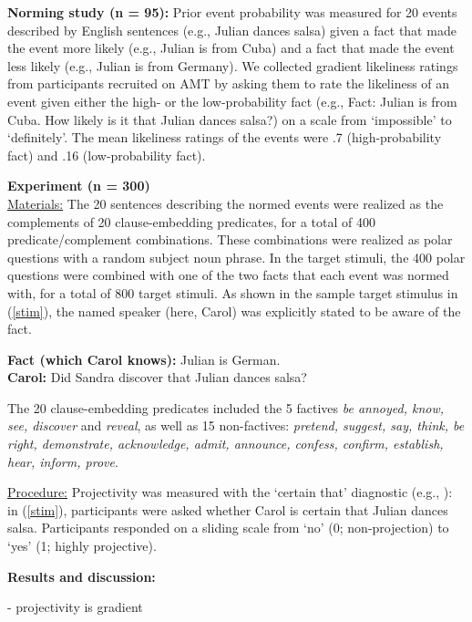 \documentclass[12pt,fleqn]{article}
\newcommand{\6}{\mbox{$[\hspace*{-.6mm}[$}}
\newcommand{\9}{\mbox{$]\hspace*{-.6mm}]$}}
\begin{document}
\noindent
{\bf Norming study (n = 95):} Prior event probability was measured for 20 events described by English sentences (e.g., Julian dances salsa) given a fact that made the event more likely (e.g., Julian is from Cuba) and a fact that made the event less likely (e.g., Julian is from Germany). We collected gradient likeliness ratings from participants recruited on AMT by asking them to rate the likeliness of an event given either the high-  or the low-probability fact (e.g., Fact: Julian is from Cuba. How likely is it that Julian dances salsa?) on a scale from `impossible' to `definitely'. The mean likeliness ratings of the events were .7 (high-probability fact) and .16 (low-probability fact).

\noindent 
{\bf Experiment (n = 300)} 
\\
\noindent
\underline{Materials:} The 20 sentences describing the normed events were realized as the complements of 20 clause-embedding predicates, for a total of 400 predicate/complement combinations. These combinations were realized as polar questions with a random subject noun phrase. In the target stimuli, the 400 polar questions were combined with one of the two facts that each event was normed with, for a total of 800 target stimuli. As shown in the sample target stimulus in (\ref{stim}), the named speaker (here, Carol) was explicitly stated to be aware of the fact.
\vspace*{-.15cm}
\begin{exe}
\ex\label{stim}
{\bf Fact (which Carol knows):} Julian is German.  \\ 
{\bf Carol:} Did Sandra discover that Julian dances salsa?
\end{exe}
\vspace*{-.15cm}
The 20 clause-embedding predicates included the 5 factives {\em be annoyed, know, see, discover} and {\em reveal}, as well as 15 non-factives: {\em pretend, suggest, say, think, be right, demonstrate, acknowledge, admit, announce, confess, confirm, establish, hear, inform, prove}.

\noindent
\underline{Procedure:} Projectivity was measured with the `certain that' diagnostic (e.g., \citealt{tbd-variability}): in (\ref{stim}), participants were asked whether Carol is certain that Julian dances salsa. Participants responded on a sliding scale from `no' (0; non-projection) to `yes' (1; highly projective).

\noindent
{\bf Results and discussion:} 

- projectivity is gradient
\end{document}

